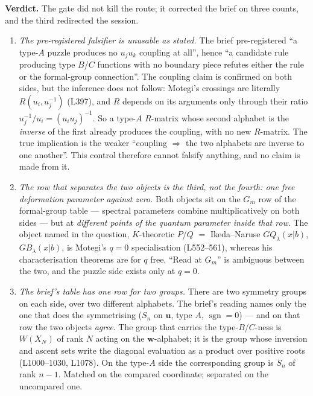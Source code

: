 \documentclass[11pt]{article}
\theoremstyle{plain}
\theoremstyle{definition}
\theoremstyle{remark}
\newcommand{\bu}{\mathbf{u}}
\newcommand{\bw}{\mathbf{w}}
\begin{document}
\noindent\textbf{Verdict.}  The gate did not kill the route; it corrected the
brief on three counts, and the third redirected the session.

\begin{enumerate}
\item[(1)] \emph{The pre-registered falsifier is unusable as stated.}  The brief
pre-registered ``a type-$A$ puzzle produces no $u_ju_k$ coupling at all'', hence
``a candidate rule producing type $B$/$C$ functions with no boundary piece
refutes either the rule or the formal-group connection''.  The coupling claim is
confirmed on both sides, but the inference does not follow: Motegi's crossings
are literally $R(u_i,u_j^{-1})$ (L397), and $R$ depends on its arguments only
through their ratio $u_j^{-1}/u_i=(u_iu_j)^{-1}$.  So a type-$A$ $R$-matrix whose
second alphabet is the \emph{inverse} of the first already produces the coupling,
with no new $R$-matrix.  The true implication is the weaker ``coupling $\Rightarrow$
the two alphabets are inverse to one another''.  This control therefore cannot
falsify anything, and no claim is made from it.
\item[(2)] \emph{The row that separates the two objects is the third, not the
fourth: one free deformation parameter against zero.}  Both objects sit on the
$G_m$ row of the formal-group table --- spectral parameters combine
multiplicatively on both sides --- but at \emph{different points of the quantum
parameter inside that row}.  The object named in the question, $K$-theoretic
$P$/$Q$ $=$ Ikeda--Naruse $GQ_\lambda(x|b)$, $GB_\lambda(x|b)$, is Motegi's
$q=0$ specialisation (L552--561), whereas his characterisation theorems are for
$q$ free.  ``Read at $G_m$'' is ambiguous between the two, and the puzzle side
exists only at $q=0$.
\item[(3)] \emph{The brief's table has one row for two groups.}  There are two
symmetry groups on each side, over two different alphabets.  The brief's reading
names only the one that does the symmetrising ($S_n$ on $\bu$, type $A$,
$\operatorname{sgn}=0$) --- and on that row the two objects \emph{agree}.  The
group that carries the type-$B$/$C$-ness is $W(X_N)$ of rank $N$ acting on the
$\bw$-alphabet; it is the group whose inversion and ascent sets write the
diagonal evaluation as a product over positive roots (L1000--1030, L1078).  On
the type-$A$ side the corresponding group is $S_n$ of rank $n-1$.  Matched on
the compared coordinate; separated on the uncompared one.
\end{enumerate}
\end{document}
